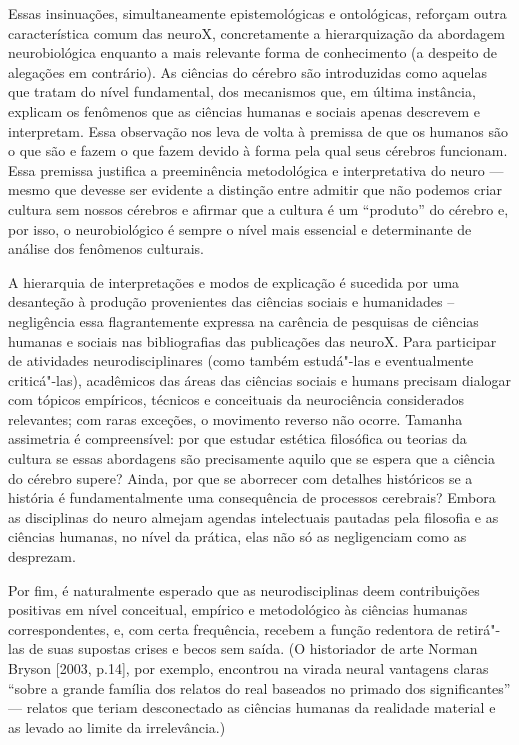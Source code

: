 Essas insinuações, simultaneamente epistemológicas e ontológicas,
reforçam outra característica comum das neuroX, concretamente a
hierarquização da abordagem neurobiológica enquanto a mais relevante
forma de conhecimento (a despeito de alegações em contrário). As
ciências do cérebro são introduzidas como aquelas que tratam do nível
fundamental, dos mecanismos que, em última instância, explicam os
fenômenos que as ciências humanas e sociais apenas descrevem e
interpretam. Essa observação nos leva de volta à premissa de que os
humanos são o que são e fazem o que fazem devido à forma pela qual seus
cérebros funcionam. Essa premissa justifica a preeminência metodológica
e interpretativa do neuro --- mesmo que devesse ser evidente a distinção
entre admitir que não podemos criar cultura sem nossos cérebros e
afirmar que a cultura é um ``produto'' do cérebro e, por isso, o
neurobiológico é sempre o nível mais essencial e determinante de análise
dos fenômenos culturais.

A hierarquia de interpretações e modos de explicação é sucedida por uma
desanteção à produção provenientes das ciências sociais e humanidades --
negligência essa flagrantemente expressa na carência de pesquisas de
ciências humanas e sociais nas bibliografias das publicações das neuroX.
Para participar de atividades neurodisciplinares (como também estudá"-las
e eventualmente criticá"-las), acadêmicos das áreas das ciências sociais
e humans precisam dialogar com tópicos empíricos, técnicos e conceituais
da neurociência considerados relevantes; com raras exceções, o movimento
reverso não ocorre. Tamanha assimetria é compreensível: por que estudar
estética filosófica ou teorias da cultura se essas abordagens são
precisamente aquilo que se espera que a ciência do cérebro supere?
Ainda, por que se aborrecer com detalhes históricos se a história é
fundamentalmente uma consequência de processos cerebrais? Embora as
disciplinas do neuro almejam agendas intelectuais pautadas pela
filosofia e as ciências humanas, no nível da prática, elas não só as
negligenciam como as desprezam.

Por fim, é naturalmente esperado que as neurodisciplinas deem
contribuições positivas em nível conceitual, empírico e metodológico às
ciências humanas correspondentes, e, com certa frequência, recebem a
função redentora de retirá"-las de suas supostas crises e becos sem
saída. (O historiador de arte Norman Bryson {[}2003, p.14{]}, por
exemplo, encontrou na virada neural vantagens claras ``sobre a grande
família dos relatos do real baseados no primado dos significantes'' ---
relatos que teriam desconectado as ciências humanas da realidade
material e as levado ao limite da irrelevância.)

